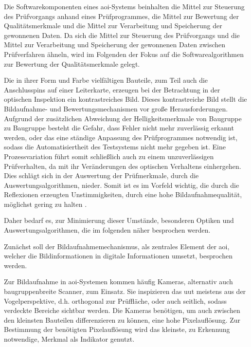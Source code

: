        Die Softwarekomponenten eines \ac{aoi}-Systems beinhalten die Mittel zur Steuerung des Prüfvorgangs anhand eines Prüfprogrammes, die Mittel zur Bewertung der Qualitätsmerkmale und die Mittel zur Verarbeitung und Speicherung der gewonnenen Daten.
        Da sich die Mittel zur Steuerung des Prüfvorgangs und die Mittel zur Verarbeitung und Speicherung der gewonnenen Daten zwischen Prüfverfahren ähneln, wird im Folgenden der Fokus auf die Softwarealgorithmen zur Bewertung der Qualitätsmerkmale gelegt.

        Die in ihrer Form und Farbe vielfältigen Bauteile, zum Teil auch die Anschlusspins auf einer Leiterkarte, erzeugen bei der Betrachtung in der optischen Inspektion ein kontrastreiches Bild.
        Dieses kontrastreiche Bild stellt die Bildaufnahme- und Bewertungsmechanismen vor große Herausforderungen.
        Aufgrund der zusätzlichen Abweichung der Helligkeitsmerkmale von Baugruppe zu Baugruppe besteht die Gefahr, dass Fehler nicht mehr zuverlässig erkannt werden, oder das eine ständige Anpassung des Prüfprogrammes notwendig ist, sodass die Automatisiertheit des Testsystems nicht mehr gegeben ist.
        Eine Prozessvariation führt somit schließlich auch zu einem unzuverlässigen Prüfverhalten, da mit ihr Veränderungen des optischen Verhaltens einhergehen. \cite{stiny_fertigung_2010}
        Dies schlägt sich in der Auswertung der Prüfmerkmale, durch die Auswertungsalgorithmen, nieder.
        Somit ist es im Vorfeld wichtig, die durch die Reflexionen erzeugten Unstimmigkeiten, durch eine hohe Bildaufnahmequalität, möglichst gering zu halten \cite{berger_test-_2012}.

        Daher bedarf es, zur Minimierung dieser Umstände, besonderen Optiken und Auswertungsalgorithmen, die im folgenden näher besprochen werden.

        Zunächst soll der Bildaufnahmemechanismus, als zentrales Element der \ac{aoi}, welcher die Bildinformationen in digitale Informationen umsetzt, besprochen werden.

        Zur Bildaufnahme in \ac{aoi}-Systemen kommen häufig Kameras, alternativ auch baugruppenbreite Scanner, zum Einsatz.
        Sie inspizieren das \ac{uut} meistens aus der Vogelperspektive, d.h. orthogonal zur Prüffläche, oder auch seitlich, sodass verdeckte Bereiche sichtbar werden.
        Die Kameras benötigen, um auch zwischen den kleinsten Bauteilen differenzieren zu können, eine hohe Pixelauflösung.
        Zur Bestimmung der benötigten Pixelauflösung wird das kleinste, zu Erkennung notwendige, Merkmal als Indikator genutzt. \cite{berger_test-_2012}

